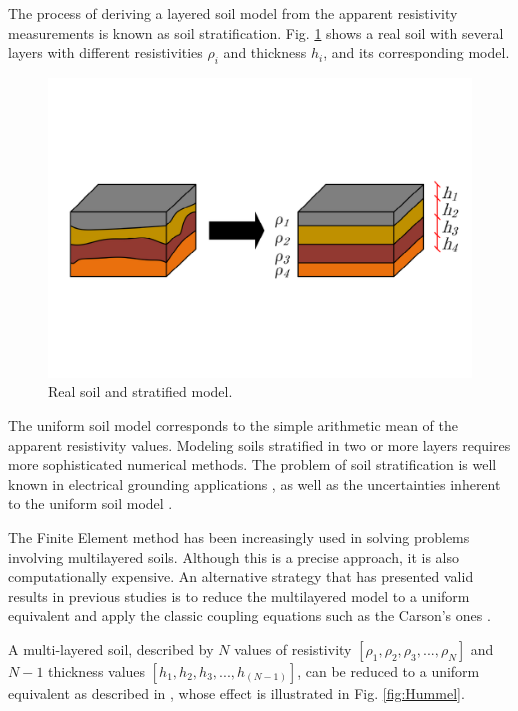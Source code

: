 \documentclass[conference]{IEEEtran}
\begin{document}
	The process of deriving a layered soil model from the apparent resistivity measurements is known as soil stratification. Fig. \ref{fig:EstratSolo} shows a real soil with several layers with different resistivities $\rho_i$ and thickness $h_i$, and its corresponding model.
	
	\begin{figure}[!hbt]
		\begin{center}
			\includegraphics[width=1\columnwidth]{fig/EstratSolo2.pdf}
			\caption{Real soil and stratified model.}
			\label{fig:EstratSolo}
		\end{center}
	\end{figure}
	
	The uniform soil model corresponds to the simple arithmetic mean of the apparent resistivity values. Modeling soils stratified in two or more layers requires more sophisticated numerical methods. The problem of soil stratification is well known in electrical grounding applications \cite{He2012}, as well as the uncertainties inherent to the uniform soil model \cite{IEEEStd80}.
	
	The Finite Element method has been increasingly used in solving problems involving multilayered soils. Although this is a precise approach, it is also computationally expensive. An alternative strategy that has presented valid results in previous studies is to reduce the multilayered model to a uniform equivalent and apply the classic coupling equations such as the Carson's ones \cite{Furlan2015}.
	
	A multi-layered soil, described by $N$ values of resistivity $[\rho_1, \rho_2, \rho_3, ..., \rho_N]$ and $N-1$ thickness values $[h_1, h_2, h_3, ..., h_{(N-1)}]$, can be reduced to a uniform equivalent as described in \cite{Martins-Britto2019}, whose effect is illustrated in Fig. \ref{fig:Hummel}.
	
\end{document}
